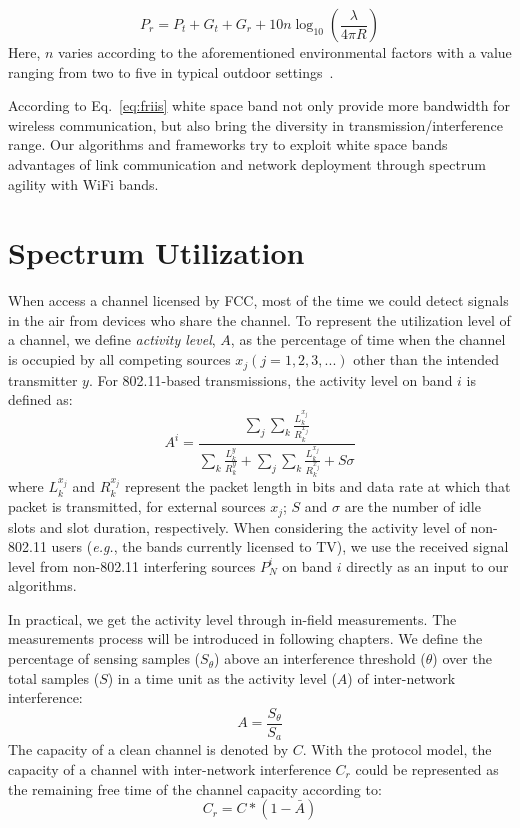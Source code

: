 \begin{equation}
\label{eq:friis}
P_r=P_t+G_t+G_r+10n \log_{10}\left( \frac{\lambda}{4\pi R}\right)
\end{equation}
Here, $n$ varies according to the aforementioned environmental 
factors with a value ranging from two to five in typical outdoor 
settings~\cite{rappaport}.

According to Eq.~\ref{eq:friis} white space band not only provide more 
bandwidth for wireless communication, but also bring the diversity in 
transmission/interference range. Our algorithms and frameworks try to 
exploit white space bands advantages of link communication and network 
deployment through spectrum agility with WiFi bands.


\section{Spectrum Utilization}

When access a channel licensed by FCC, most of the time we could detect signals in the 
air from devices who share the channel. To represent the utilization level of a channel, 
we define \emph{activity level}, $A$, as the percentage of time when the channel is 
occupied by all competing sources $x_j (j = 1, 2, 3, ...)$ other than the intended 
transmitter $y$. For 802.11-based transmissions, the activity level on band $i$ is 
defined as:
\begin{equation}
\label{eqn:80211activity}
A^i = \frac{\sum_j{\sum_k{\frac{L_k^{x_j}}{R_k^{x_j}}}}}{\sum_k{\frac{L_k^y}{R_k^y}}+\sum_j{\sum_k{\frac{L_k^{x_j}}{R_k^{x_j}}}}+S\sigma}
\end{equation}
where $L_k^{x_j}$ and $R_k^{x_j}$ represent the packet length in bits and data
rate at which that packet is transmitted, for external sources $x_j$;
$S$ and $\sigma$ are the number of idle slots and slot duration, respectively. 
When considering the activity level of non-802.11 users 
({\it e.g.}, the bands currently licensed to TV),
we use the received signal level from non-802.11 interfering sources $P_N^i$ 
on band $i$ directly as an input to our algorithms. 


In practical, we get the activity level through in-field measurements.
The measurements process will be introduced in following chapters.
We define the percentage of sensing samples ($S_\theta$) above an 
interference threshold ($\theta$) over the total samples ($S$) in a time unit as the 
activity level ($A$) of inter-network interference:
\begin{equation}
\label{eq:actdef}
A=\frac{S_\theta}{S_a}
\end{equation}
The capacity of a clean channel is denoted by $C$. With the protocol model, the capacity 
of a channel with inter-network interference $C_r$ could be represented as 
the remaining free time of the channel capacity according to: 
\begin{equation}
\label{eq:intercap}
C_r=C*(1-\bar{A})
\end{equation}


